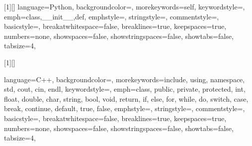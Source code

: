 
\usepackage{amsmath}
\usepackage{graphicx}
\usepackage{amssymb}
\usepackage{listings}
\usepackage{float}
\usepackage{color}
\usepackage{xcolor}



\newcommand\pythonstyle
{\lstset
    {
        language=Python,
        backgroundcolor=\color{backcolour},
        morekeywords={self},
        keywordstyle=\ttfamily\color{deepblue},
        emph={class,__init__,def},
        emphstyle=\ttfamily\color{deepred},
        stringstyle=\color{deepgreen},
        commentstyle=\color{codegreen},
        basicstyle=\ttfamily\footnotesize,
        breakatwhitespace=false,
        breaklines=true,
        keepspaces=true,
        numbers=none,
        showspaces=false,
        showstringspaces=false,
        showtabs=false,
        tabsize=4,
    }
}

\newcommand\cppstyle
{\lstset
    {
        language=C++,
        backgroundcolor=\color{backcolour},
        morekeywords={include, using, namespace, std, cout, cin, endl},
        keywordstyle=\ttfamily\color{deepblue},
        emph={class, public, private, protected, int, float, double, char, string, bool, void, return, if, else, for, while, do, switch, case, break, continue, default, true, false},
        emphstyle=\ttfamily\color{deepred},
        stringstyle=\color{deepgreen},
        commentstyle=\color{codegreen},
        basicstyle=\ttfamily\footnotesize,
        breakatwhitespace=false,
        breaklines=true,
        keepspaces=true,
        numbers=none,
        showspaces=false,
        showstringspaces=false,
        showtabs=false,
        tabsize=4,
    }
}

[1][]
    {\lstset
    {
        language=Python,
        backgroundcolor=\color{backcolour},
        morekeywords={self},
        keywordstyle=\ttfamily\color{deepblue},
        emph={class,__init__,def},
        emphstyle=\ttfamily\color{deepred},
        stringstyle=\color{deepgreen},
        commentstyle=\color{codegreen},
        basicstyle=\ttfamily\footnotesize,
        breakatwhitespace=false,
        breaklines=true,
        keepspaces=true,
        numbers=none,
        showspaces=false,
        showstringspaces=false,
        showtabs=false,
        tabsize=4,
    }
    }
{}

[1][]
{
\cppstyle
\lstset{#1}
}
{}

\newcommand\pythoninline[1]{{\pythonstyle\lstinline!#1!}}
\newcommand\cppinline[1]{{\cppstyle\lstinline!#1!}}